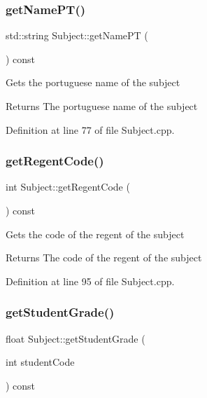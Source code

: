 \subsubsection{\texorpdfstring{get\+Name\+P\+T()}{getNamePT()}}
{\footnotesize\ttfamily std\+::string Subject\+::get\+Name\+PT (\begin{DoxyParamCaption}{ }\end{DoxyParamCaption}) const}

Gets the portuguese name of the subject \begin{DoxyReturn}{Returns}
The portuguese name of the subject 
\end{DoxyReturn}


Definition at line 77 of file Subject.\+cpp.

\mbox{\label{classSubject_afbdb9379e3d0ceb44b838cf113931a23}} 
\subsubsection{\texorpdfstring{get\+Regent\+Code()}{getRegentCode()}}
{\footnotesize\ttfamily int Subject\+::get\+Regent\+Code (\begin{DoxyParamCaption}{ }\end{DoxyParamCaption}) const}

Gets the code of the regent of the subject \begin{DoxyReturn}{Returns}
The code of the regent of the subject 
\end{DoxyReturn}


Definition at line 95 of file Subject.\+cpp.

\mbox{\label{classSubject_a625235d561cd4266a23cc6a09fddadc8}} 
\subsubsection{\texorpdfstring{get\+Student\+Grade()}{getStudentGrade()}}
{\footnotesize\ttfamily float Subject\+::get\+Student\+Grade (\begin{DoxyParamCaption}\item[{int}]{student\+Code }\end{DoxyParamCaption}) const}

